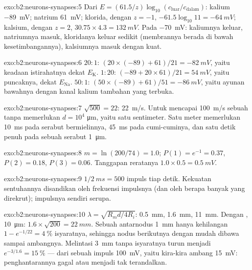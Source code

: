 \begin{solution}{exo:b2:neurons-synapses:5}
Dari $E = (61.5/z)\log_{10}(c_{\text{luar}}/c_{\text{dalam}})$: kalium
\qty{-89}{mV}; natrium \qty{+61}{mV}; klorida, dengan $z =
-1$,
$-61.5\log_{10} 11 = \qty{-64}{mV}$; kalsium, dengan $z = 2$,
$30.75\times 4.3 = \qty{+132}{mV}$. Pada \qty{-70}{mV}: kaliumnya
keluar, natriumnya masuk, kloridanya keluar sedikit (membrannya berada
di bawah kesetimbangannya), kalsiumnya masuk dengan kuat.
\end{solution}

\begin{solution}{exo:b2:neurons-synapses:6}
$20 : 1$: $(20\times(-89) + 61)/21 = \qty{-82}{mV}$, yaitu keadaan
istirahatnya dekat $E_{\mathrm K}$. $1 : 20$: $(-89 + 20\times 61)/21 =
\qty{+54}{mV}$, yaitu puncaknya, dekat $E_{\mathrm{Na}}$. $50 : 1$: $(50\times
(-89) + 61)/51 = \qty{-86}{mV}$, yaitu ayunan bawahnya dengan kanal
kalium tambahan yang terbuka.
\end{solution}

\begin{solution}{exo:b2:neurons-synapses:7}
$\sqrt{500} = 22$: \qty{22}{m/s}. Untuk mencapai \qty{100}{m/s} sebuah
 tanpa  memerlukan $d = 10^{4}$ \unit{\micro m}, yaitu satu
sentimeter. Satu meter memerlukan \qty{10}{ms} pada serabut
bermielinnya, \qty{45}{ms} pada  cumi-cuminya, dan satu detik
penuh pada sebuah serabut \qty{1}{\micro m}.
\end{solution}

\begin{solution}{exo:b2:neurons-synapses:8}
$m = \ln(200/74) = 1.0$; $P(1) = e^{-1} = 0.37$, $P(2) = 0.18$, $P(3)
= 0.06$. Tanggapan reratanya $1.0\times 0.5 = \qty{0.5}{mV}$.
\end{solution}

\begin{solution}{exo:b2:neurons-synapses:9}
$1/\qty{2}{ms} = 500$ impuls tiap detik. Kekuatan sentuhannya
disandikan oleh frekuensi impulsnya (dan oleh berapa banyak  yang
direkrut); impulsnya sendiri serupa.
\end{solution}

\begin{solution}{exo:b2:neurons-synapses:10}
$\lambda = \sqrt{R_m d/4R_i}$: \qty{0.5}{mm}, \qty{1.6}{mm},
\qty{11}{mm}. Dengan , \qty{10}{\micro m}: $1.6\times\sqrt{200} =
\qty{22}{mm}$. Sebuah antarnodus \qty{1}{mm} hanya kehilangan $1 - e^{-1/22}
= \qty{4}{\%}$ isyaratnya, sehingga nodus berikutnya dengan mudah
dibawa sampai ambangnya. Melintasi \qty{3}{mm} tanpa  isyaratnya
turun menjadi $e^{-3/1.6} = \qty{15}{\%}$ --- dari sebuah impuls
\qty{100}{mV}, yaitu kira-kira ambang \qty{15}{mV}: penghantarannya
gagal atau menjadi tak terandalkan.
\end{solution}

